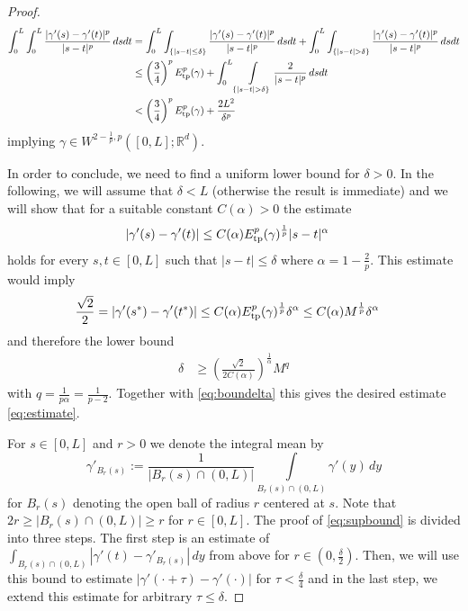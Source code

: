 \documentclass{article}
\def\R{{\mathbb R}}
\begin{document}
\begin{proof}
    \begin{align}
        \int_0^L \int_0^L \frac{|\gamma'(s) - \gamma'(t)|^p}{|s-t|^p}\, ds dt &= \int_0^L \int_{\{|s-t|\leq \delta\}} \frac{|\gamma'(s) - \gamma'(t)|^p}{|s-t|^p}\, ds dt + \int_0^L \int_{\{|s-t|> \delta\}} \frac{|\gamma'(s) - \gamma'(t)|^p}{|s-t|^p}\, ds dt \nonumber \\
        &\leq \left( \frac{3}{4} \right)^pE^p_{\rm tp}(\gamma) + \int_0^L \int\limits_{\{|s-t|>\delta\}} \frac{2}{|s-t|^p}\, ds dt\nonumber \\
        &< \left( \frac{3}{4} \right)^p E^p_{\rm tp}(\gamma) + \frac{2L^2}{\delta^p}\label{eq:boundelta}
    \end{align}
    implying $\gamma \in W^{2-\frac{1}{p}, p}([0,L];\R^d)$.

    In order to conclude, we need to find a uniform lower bound for $\delta>0$.
    In the following, we will assume that $\delta < L$ (otherwise the result is immediate) and we will show that for a suitable constant $C(\alpha)>0$ the estimate
    \begin{align}{\label{eq:supbound}}
        |\gamma'(s) - \gamma'(t)| &\leq C(\alpha) E_{\rm tp}^p (\gamma)^\frac{1}{p} |s-t|^\alpha
    \end{align}
    holds for every $s,t \in [0,L]$ such that $|s-t| \leq \delta$ where $\alpha = 1- \frac{2}{p}$. This estimate would imply
    \begin{align*}
        \frac{\sqrt{2}}{2} = |\gamma'(s^*) - \gamma'(t^*)| &\leq C(\alpha) E_{\rm tp}^p (\gamma)^\frac{1}{p} \delta^\alpha  \leq C(\alpha) M^\frac{1}{p}\delta^\alpha
    \end{align*}
    and therefore the lower bound  
    \begin{align*}
        \delta &\geq \left( \frac{\sqrt{2} }{2C(\alpha)} \right)^\frac{1}{\alpha} M^q
    \end{align*}
     with $q = \frac{1}{p\alpha} = \frac{1}{p-2}$. Together with \eqref{eq:boundelta} this gives the desired estimate \eqref{eq:estimate}.
    
    For $s\in[0,L]$ and $r>0$ we denote the integral mean by 
    \begin{equation*}
        \gamma'_{B_r(s)} := \frac{1}{|B_r(s) \cap (0,L)|}\int\limits_{B_r(s)  \cap (0,L)} \gamma'(y) \, dy
    \end{equation*}
    for $B_r(s)$ denoting the open ball of radius $r$ centered at $s$. Note that $2r \geq |B_r(s) \cap (0,L)|\geq r$ for $r\in[0,L]$.
    The proof of \eqref{eq:supbound} is divided into three steps. The first step is an estimate of $\int_{B_r(s)\cap(0,L)} |\gamma'(t) - \gamma'_{B_r(s)}| \, dy$ from above for $r \in (0,\frac{\delta}{2})$. 
    Then, we will use this bound to estimate $|\gamma'(\cdot+\tau) - \gamma'(\cdot)|$ for $\tau<\frac{\delta}{4}$ and in the last step, we extend this estimate for arbitrary $\tau\leq \delta$. 
    

\end{proof}
\end{document}
